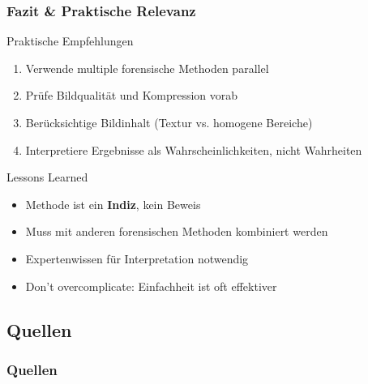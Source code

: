 \documentclass[11pt,t,usepdftitle=false,aspectratio=169]{beamer}
\begin{document}
\begin{frame}
	\frametitle{Fazit \& Praktische Relevanz}
	
	\begin{alertblock}{Praktische Empfehlungen}
		\begin{enumerate}
			\item Verwende multiple forensische Methoden parallel
			\item Prüfe Bildqualität und Kompression vorab
			\item Berücksichtige Bildinhalt (Textur vs. homogene Bereiche)
			\item Interpretiere Ergebnisse als Wahrscheinlichkeiten, nicht Wahrheiten
		\end{enumerate}
	\end{alertblock}
    
    \begin{block}{Lessons Learned}
        \begin{itemize}
            \item Methode ist ein \textbf{Indiz}, kein Beweis
            \item Muss mit anderen forensischen Methoden kombiniert werden
            \item Expertenwissen für Interpretation notwendig
            \item Don't overcomplicate: Einfachheit ist oft effektiver
        \end{itemize}
    \end{block}
\end{frame}

\subsection{Quellen}
\begin{frame}
    \frametitle{Quellen}
    \begingroup
    \setlength{\bibitemsep}{2pt}
    \setlength{\itemsep}{0pt}
    \setlength{\parskip}{0pt}
    \renewcommand{\bibfont}{\tiny}
    \printbibliography[heading=none]
    \endgroup
\end{frame}
\end{document}

